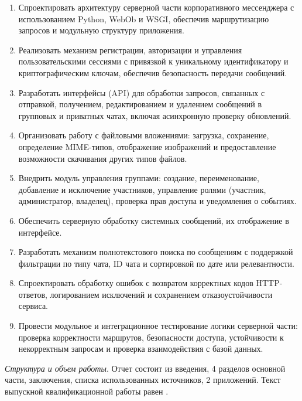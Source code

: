 \begin{enumerate}
	\item Спроектировать архитектуру серверной части корпоративного мессенджера с использованием Python, WebOb и WSGI, обеспечив маршрутизацию запросов и модульную структуру приложения.
	
	\item Реализовать механизм регистрации, авторизации и управления пользовательскими сессиями с привязкой к уникальному идентификатору и криптографическим ключам, обеспечив безопасность передачи сообщений.
	
	\item Разработать интерфейсы (API) для обработки запросов, связанных с отправкой, получением, редактированием и удалением сообщений в групповых и приватных чатах, включая асинхронную проверку обновлений.
	
	\item Организовать работу с файловыми вложениями: загрузка, сохранение, определение MIME-типов, отображение изображений и предоставление возможности скачивания других типов файлов.
	
	\item Внедрить модуль управления группами: создание, переименование, добавление и исключение участников, управление ролями (участник, администратор, владелец), проверка прав доступа и уведомления о событиях.
	
	\item Обеспечить серверную обработку системных сообщений, их отображение в интерфейсе.
	
	\item Разработать механизм полнотекстового поиска по сообщениям с поддержкой фильтрации по типу чата, ID чата и сортировкой по дате или релевантности.
	
	\item Спроектировать обработку ошибок с возвратом корректных кодов HTTP-ответов, логированием исключений и сохранением отказоустойчивости сервиса.
	
	\item Провести модульное и интеграционное тестирование логики серверной части: проверка корректности маршрутов, безопасности доступа, устойчивости к некорректным запросам и проверка взаимодействия с базой данных.
\end{enumerate}


\textit{Структура и объем работы}. Отчет состоит из введения, 4 разделов основной части, заключения, списка использованных источников, 2 приложений. Текст выпускной квалификационной работы равен .

